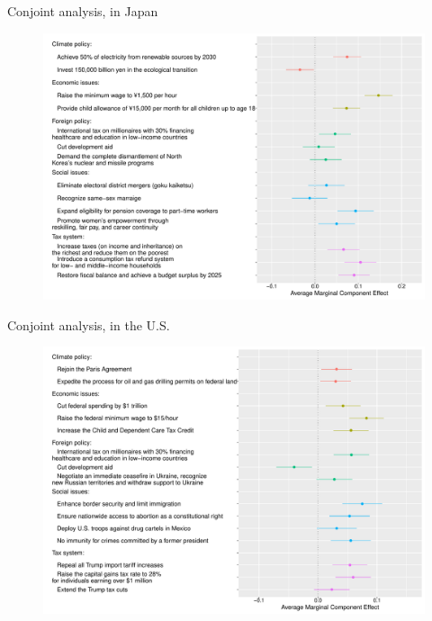 \documentclass[aspectratio=169,xcolor=dvipsnames, 11pt,mathserif]{beamer}
\begin{document}
\begin{frame}{Conjoint analysis,  in Japan\label{conjoint_countries} \hyperlink{conjoint_country}{}} 
    \begin{figure} \vspace{-.14cm}
\includegraphics[height=.97\textheight]{../figures/all/conjoint_EN-JA.pdf}
\end{figure}
\end{frame}

\begin{frame}{Conjoint analysis,  in the U.S.\label{conjoint_countries} \hyperlink{conjoint_country}{}} 
    \begin{figure} \vspace{-.14cm}
\includegraphics[height=.97\textheight]{../figures/all/conjoint_EN.pdf}
\end{figure}
\end{frame}
\end{document}
